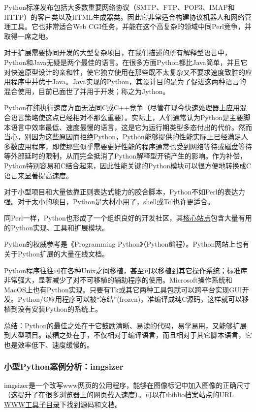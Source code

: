 \documentclass[12pt,oneside]{book}
\begin{document}
\begin{common-format}
Python标准发布包括大多数重要网络协议（SMTP、FTP、POP3、IMAP和HTTP）的客户类以及HTML生成器类。因此它非常适合构建协议机器人和网络管理工具。它也非常适合Web CGI任务，并能在这个高复杂的领域中同Perl竞争，并取得一席之地。

对于扩展需要协同开发的大型复杂项目，在我们描述的所有解释型语言中，Python和Java无疑是两个最佳的语言。在很多方面Python都比Java简单，并且它对快速原型设计的亲和性，使它独立使用在那些既不太复杂又不要求速度致胜的应用程序中并优于Java。Java实现的Python，其设计目的是为了促进这两种语言的混合使用，目前已面世了并用于开发；称之为Jython。

Python在纯执行速度方面无法同C或C++竞争（尽管在现今快速处理器上应用混合语言策略使这点已经相对不那么重要）。实际上，人们通常认为Python是主要脚本语言中效率最低、速度最慢的语言，这是它为运行期类型多态付出的代价。然而当心，别因为这些原因而拒绝Python，Python能够提供的性能实际上已经满足人多数应用程序，即使那些似乎需要更好性能的程序通常也受到网络等待或磁盘等待等外部延时的限制，从而完全抵消了Python解释型开销产生的影响。作为补偿，Python特别容易和C结合起来，因此性能关键的Python模块可以很方便地转换成C语言来显著提高速度。

对于小型项目和大量依靠正则表达式能力的胶合脚本，Python不如Perl的表达力强。对于太小的项目，Python是大材小用了，shell或Tcl也许更适合。

同Perl一样，Python也形成了一个组织良好的开发社区，其\href{http://www.python.org/}{核心站点}包含大量有用的Python实现、工具和扩展模块。

Python的权威参考是《Programming Python》（Python编程）\cite{Lutz}。Python网站上也有关于Python扩展的大量在线文档。

Python程序往往可在各种Unix之间移植，甚至可以移植到其它操作系统；标准库非常强大，显著减少了对不可移植的辅助程序的使用。Microsoft操作系统和MacOS上也有Python实现。只要有Tk或其它两种工具包就可以跨平台实现GUI开发。Python/C应用程序可以被“冻结”(frozen)，准编译成纯C源码，这样就可以移植到没有安装Python的系统上。

总结：Python的最佳之处在于它鼓励清晰、易读的代码，易学易用，又能够扩展到大型项目。最糟之处在于，不仅相对于编译语言，而且相对于其它脚本语言，它也是效率低下、速度缓慢的。

\subsubsection{小型Python案例分析：imgsizer}
imgsizer是一个改写www网页的公用程序，能够在图像标记中加入图像的正确尺寸（这提升了在很多浏览器上的网页载入速度）。可以在ibiblio档案站点的URL \href{http://www.ibiblio.org/}{WWW工具子目录}下找到源码和文档。


\end{common-format}
\end{document}
